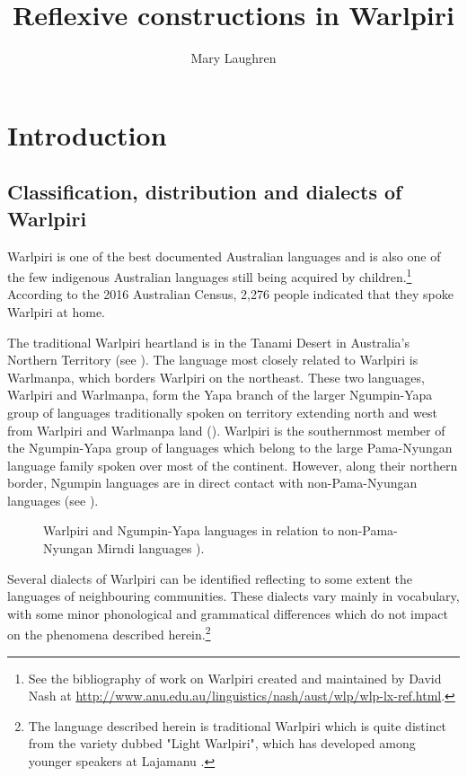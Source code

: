 \documentclass[output=paper]{../langscibook}
\author{Mary Laughren\affiliation{University of Queensland}\orcid{}}
\title{Reflexive constructions in Warlpiri}
\begin{document}
\maketitle 

\section{Introduction}\label{sec:laughren:1}

\subsection{Classification, distribution and dialects of Warlpiri}\label{sec:laughren:1.1}

Warlpiri is one of the best documented Australian languages and is also one of the few indigenous Australian languages still being acquired by children.\footnote{See the bibliography of work on Warlpiri created and maintained by David Nash at \url{http://www.anu.edu.au/linguistics/nash/aust/wlp/wlp-lx-ref.html}.} According to the 2016 Australian Census, 2,276 people indicated that they spoke Warlpiri at home.

The traditional Warlpiri heartland is in the Tanami Desert in Australia's Northern Territory (see ). The language most closely related to Warlpiri is Warlmanpa, which borders Warlpiri on the northeast. These two languages, Warlpiri and Warlmanpa, form the Yapa branch of the larger Ngumpin-Yapa group of languages traditionally spoken on territory extending north and west from Warlpiri and Warlmanpa land (\citealt{McConvellLaughren2004, MeakinsEtAlForth}). Warlpiri is the southernmost member of the Ngumpin-Yapa group of languages which belong to the large Pama-Nyungan language family spoken over most of the continent. However, along their northern border, Ngumpin languages are in direct contact with non-Pama-Nyungan languages (see \citealt{Dixon2002, EvansEd2003}).

\begin{figure}
\caption{Warlpiri and Ngumpin-Yapa languages in relation to non-Pama-Nyungan Mirndi languages  \citealt{BrendaThornley2017}).}
\label{fig:laughren:1}
\end{figure}

Several dialects of Warlpiri can be identified reflecting to some extent the languages of neighbouring communities. These dialects vary mainly in vocabulary, with some minor phonological and grammatical differences which do not impact on the phenomena described herein.\footnote{The language described herein is traditional Warlpiri which is quite distinct from the variety dubbed "Light Warlpiri", which has developed among younger speakers at Lajamanu \citealt{OShannessy2005, OShannessy2006, OShannessy2013}.}
\end{document}
